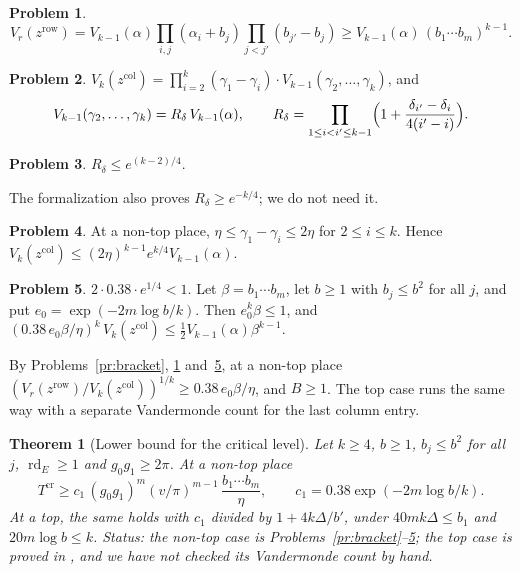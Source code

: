 \documentclass[reqno]{amsart}
\theoremstyle{definition}
\newtheorem{problem}{Problem}[section]
\theoremstyle{plain}
\newtheorem{theorem}{Theorem}[section]
\theoremstyle{remark}
\newcommand{\rd}{\operatorname{rd}}
\newcommand{\Tc}{T^{\mathrm{cr}}}
\newcommand{\zr}{z^{\mathrm{row}}}
\newcommand{\zc}{z^{\mathrm{col}}}
\begin{document}
\begin{problem}\label{pr:row}
\[
 V_r(\zr)=V_{k-1}(\alpha)\prod_{i,j}(\alpha_i+b_j)\prod_{j<j'}(b_{j'}-b_j)
 \ge V_{k-1}(\alpha)\,(b_1\cdots b_m)^{k-1}.
\]
\end{problem}

\begin{problem}\label{pr:split}
$V_k(\zc)=\prod_{i=2}^k(\gamma_1-\gamma_i)\cdot
V_{k-1}(\gamma_2,\dots,\gamma_k)$, and
\[
 V_{k-1}(\gamma_2,\dots,\gamma_k)=R_\delta\,V_{k-1}(\alpha),\qquad
 R_\delta=\prod_{1\le i<i'\le k-1}
 \Bigl(1+\frac{\delta_{i'}-\delta_i}{4(i'-i)}\Bigr).
\]
\end{problem}

\begin{problem}\label{pr:R}
$R_\delta\le e^{(k-2)/4}$.
\end{problem}

The formalization also proves $R_\delta\ge e^{-k/4}$; we do not need it.

\begin{problem}\label{pr:edge}
At a non-top place, $\eta\le\gamma_1-\gamma_i\le2\eta$ for $2\le i\le k$.  Hence
$V_k(\zc)\le(2\eta)^{k-1}e^{k/4}V_{k-1}(\alpha)$.
\end{problem}

\begin{problem}\label{pr:constant}
$2\cdot0.38\cdot e^{1/4}<1$.  Let $\beta=b_1\cdots b_m$, let $b\ge1$ with
$b_j\le b^2$ for all $j$, and put $e_0=\exp(-2m\log b/k)$.  Then
$e_0^k\beta\le1$, and
$(0.38\,e_0\beta/\eta)^k\,V_k(\zc)\le\tfrac12V_{k-1}(\alpha)\beta^{k-1}$.
\end{problem}

By Problems~\ref{pr:bracket}, \ref{pr:row} and~\ref{pr:constant}, at a
non-top place $(V_r(\zr)/V_k(\zc))^{1/k}\ge0.38\,e_0\beta/\eta$, and
$B\ge1$.  The top case runs the same way with a separate Vandermonde
count for the last column entry.

\begin{theorem}[Lower bound for the critical level]\label{thm:below}
Let $k\ge4$, $b\ge1$, $b_j\le b^2$ for all $j$, $\rd_E\ge1$ and
$g_0g_1\ge2\pi$.  At a non-top place
\[
 \Tc\ge c_1\,(g_0g_1)^m(v/\pi)^{m-1}\,\frac{b_1\cdots b_m}{\eta},
 \qquad c_1=0.38\exp(-2m\log b/k).
\]
At a top, the same holds with $c_1$ divided by $1+4k\Delta/b'$, under
$40mk\Delta\le b_1$ and $20m\log b\le k$.
\emph{Status}: the non-top case is Problems~\ref{pr:bracket}--\ref{pr:constant};
the top case is proved in \cite{Lean}, and we have not checked its
Vandermonde count by hand.
\end{theorem}
\end{document}
